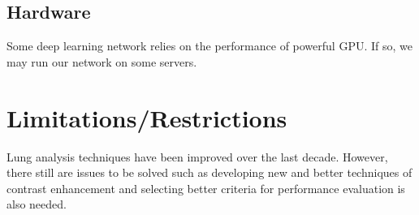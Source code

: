 \documentclass[hyperref]{article}
\theoremstyle{nonumberplain}
\begin{document}
\subsection{Hardware}
Some deep learning network relies on the performance of powerful GPU. If so, we may run our network on some servers.

\section{Limitations/Restrictions}
Lung analysis techniques have been improved over the last decade. However, there still are issues to be solved such as developing new and better techniques of contrast enhancement and selecting better criteria for performance evaluation is also needed. 
\end{document}
